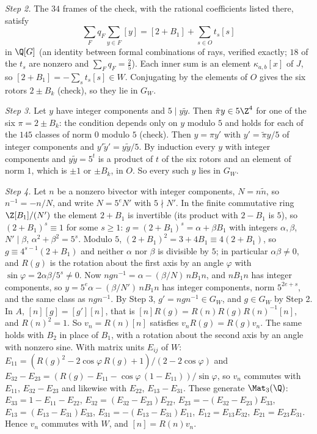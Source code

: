 \emph{Step 2.} The $34$ frames of the check, with the rational coefficients listed there, satisfy
\[
\sum_{F}q_{F}\sum_{y \in F}[y] = [2 + B_{1}] + \sum_{s \in O}t_{s}[s]
\]
in $\Q[G]$ (an identity between formal combinations of rays, verified exactly; $18$ of the $t_{s}$ are nonzero and $\sum_{F}q_{F} = \tfrac25$). Each inner sum is an element $\kappa_{a,b}[x]$ of $J$, so $[2 + B_{1}] = -\sum_{s}t_{s}[s] \in W$. Conjugating by the elements of $O$ gives the six rotors $2 \pm B_{k}$ (check), so they lie in $G_{W}$.

\emph{Step 3.} Let $y$ have integer components and $5 \mid y\tilde{y}$. Then $\tilde{\pi}y \in 5\Z^{4}$ for one of the six $\pi = 2 \pm B_{k}$: the condition depends only on $y$ modulo $5$ and holds for each of the $145$ classes of norm $0$ modulo $5$ (check). Then $y = \pi y'$ with $y' = \tilde{\pi}y/5$ of integer components and $y'\tilde{y}' = y\tilde{y}/5$. By induction every $y$ with integer components and $y\tilde{y} = 5^{t}$ is a product of $t$ of the six rotors and an element of norm $1$, which is $\pm 1$ or $\pm B_{k}$, in $O$. So every such $y$ lies in $G_{W}$.

\emph{Step 4.} Let $n$ be a nonzero bivector with integer components, $N = n\tilde{n}$, so $n^{-1} = -n/N$, and write $N = 5^{e}N'$ with $5 \nmid N'$. In the finite commutative ring $\Z[B_{1}]/(N')$ the element $2 + B_{1}$ is invertible (its product with $2 - B_{1}$ is $5$), so $(2 + B_{1})^{s} \equiv 1$ for some $s \ge 1$: $g = (2 + B_{1})^{s} = \alpha + \beta B_{1}$ with integers $\alpha, \beta$, $N' \mid \beta$, $\alpha^{2} + \beta^{2} = 5^{s}$. Modulo $5$, $(2 + B_{1})^{2} = 3 + 4B_{1} \equiv 4(2 + B_{1})$, so $g \equiv 4^{s-1}(2 + B_{1})$ and neither $\alpha$ nor $\beta$ is divisible by $5$; in particular $\alpha\beta \ne 0$, and $R(g)$ is the rotation about the first axis by an angle $\varphi$ with $\sin\varphi = 2\alpha\beta/5^{s} \ne 0$. Now $ngn^{-1} = \alpha - (\beta/N)\,nB_{1}n$, and $nB_{1}n$ has integer components, so $y = 5^{e}\alpha - (\beta/N')\,nB_{1}n$ has integer components, norm $5^{2e+s}$, and the same class as $ngn^{-1}$. By Step 3, $g' = ngn^{-1} \in G_{W}$, and $g \in G_{W}$ by Step 2. In $A$, $[n][g] = [g'][n]$, that is $[n]R(g) = R(n)R(g)R(n)^{-1}[n]$, and $R(n)^{2} = 1$. So $v_{n} = R(n)[n]$ satisfies $v_{n}R(g) = R(g)v_{n}$. The same holds with $B_{2}$ in place of $B_{1}$, with a rotation about the second axis by an angle with nonzero sine. With matrix units $E_{ij}$ of $W$: $E_{11} = (R(g)^{2} - 2\cos\varphi\,R(g) + 1)/(2 - 2\cos\varphi)$ and $E_{32} - E_{23} = (R(g) - E_{11} - \cos\varphi\,(1 - E_{11}))/\sin\varphi$, so $v_{n}$ commutes with $E_{11}$, $E_{32} - E_{23}$ and likewise with $E_{22}$, $E_{13} - E_{31}$. These generate $\Mat_{3}(\Q)$: $E_{33} = 1 - E_{11} - E_{22}$, $E_{32} = (E_{32} - E_{23})E_{22}$, $E_{23} = -(E_{32} - E_{23})E_{33}$, $E_{13} = (E_{13} - E_{31})E_{33}$, $E_{31} = -(E_{13} - E_{31})E_{11}$, $E_{12} = E_{13}E_{32}$, $E_{21} = E_{23}E_{31}$. Hence $v_{n}$ commutes with $W$, and $[n] = R(n)v_{n}$.

